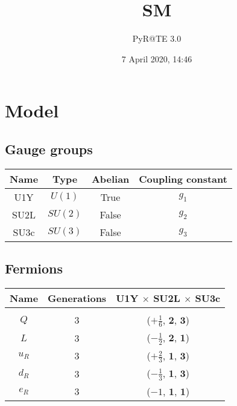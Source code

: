 \documentclass[12pt]{article}
\title{SM}
\author{PyR@TE 3.0}
\date{7 April 2020, 14:46}
\begin{document}
    \maketitle
    \tableofcontents
    \clearpage

\section{Model}{

\subsection{Gauge groups}

\begin{table}[h]
\renewcommand{\arraystretch}{1.3}
\centering
\begin{tabular}{c@{\hskip .66cm}c@{\hskip .66cm}c@{\hskip .5cm}c}
\hline
Name & Type & Abelian & Coupling constant \\ \hline
U1Y & $U(1)$ & True & $g_{1}$ \\
SU2L & $SU(2)$ & False & $g_{2}$ \\
SU3c & $SU(3)$ & False & $g_{3}$ \\ \hline
\end{tabular}
\end{table}

\subsection{Fermions}

\begin{table}[h]
\renewcommand{\arraystretch}{1.15}
\centering
\begin{tabular}{c@{\hskip .66cm}c@{\hskip .66cm}c}
\hline
Name & Generations & U1Y $\times$ SU2L $\times$ SU3c\\ \hline \\ [-2ex]
$Q$ & 3 & ($+\frac{1}{6}$, $\mathbf{2}$, $\mathbf{3}$) \\[.2cm]
$L$ & 3 & ($- \frac{1}{2}$, $\mathbf{2}$, $\mathbf{1}$) \\[.2cm]
$u_R$ & 3 & ($+\frac{2}{3}$, $\mathbf{1}$, $\mathbf{3}$) \\[.2cm]
$d_R$ & 3 & ($- \frac{1}{3}$, $\mathbf{1}$, $\mathbf{3}$) \\[.2cm]
$e_R$ & 3 & ($-1$, $\mathbf{1}$, $\mathbf{1}$) \\[.1cm] \hline
\end{tabular}
\end{table}

}
\end{document}
